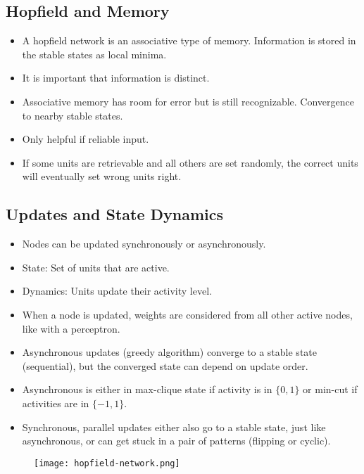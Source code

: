 \documentclass[main]{subfiles}
\begin{document}
\subsection{Hopfield and Memory}
\begin{itemize}[noitemsep,nolistsep]
	\item A hopfield network is an associative type of memory. Information is stored in the stable states as local minima.
	\item It is important that information is distinct.
	\item Associative memory has room for error but is still recognizable. Convergence to nearby stable states.
	\item Only helpful if reliable input.
	\item If some units are retrievable and all others are set randomly, the correct units will eventually set wrong units right.
\end{itemize}

\subsection{Updates and State Dynamics}
\begin{itemize}[noitemsep,nolistsep]
	\item Nodes can be updated synchronously or asynchronously.
	\item State: Set of units that are active.
	\item Dynamics: Units update their activity level.
	\item When a node is updated, weights are considered from all other active nodes, like with a perceptron.
	\item Asynchronous updates (greedy algorithm) converge to a stable state (sequential), but the converged state can depend on update order.
	\item Asynchronous is either in max-clique state if activity is in $\{0,1\}$ or min-cut if activities are in $\{-1,1\}$.
	\item Synchronous, parallel updates either also go to a stable state, just like asynchronous, or can get stuck in a pair of patterns (flipping or cyclic).
\end{itemize}
\begin{figure}[H]
	\centering
	\texttt{[image: hopfield-network.png]}
\end{figure}
\end{document}
